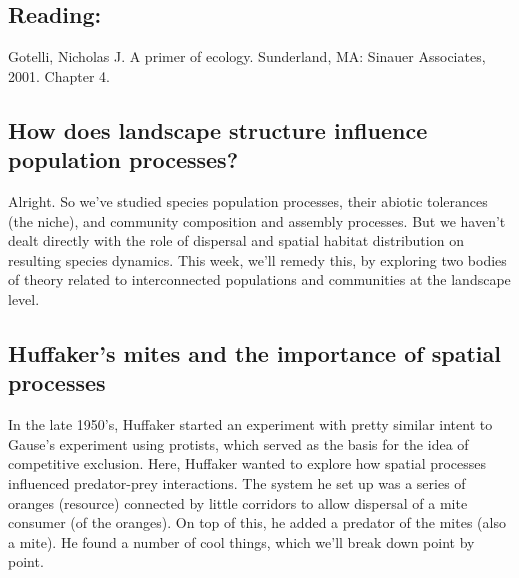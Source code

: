 \documentclass[12pt]{article}
\begin{document}
\subsection*{Reading:}


Gotelli, Nicholas J. A primer of ecology. Sunderland, MA: Sinauer Associates, 2001. Chapter 4. \\














\begin{center}
\noindent\hrulefill 
\end{center}





\clearpage

\subsection*{How does landscape structure influence population processes?}

Alright. So we've studied species population processes, their abiotic tolerances (the niche), and community composition and assembly processes. But we haven't dealt directly with the role of dispersal and spatial habitat distribution on resulting species dynamics. This week, we'll remedy this, by exploring two bodies of theory related to interconnected populations and communities at the landscape level. 





\bigskip


\subsection*{Huffaker's mites and the importance of spatial processes}

In the late 1950's, Huffaker started an experiment with pretty similar intent to Gause's experiment using protists, which served as the basis for the idea of competitive exclusion. Here, Huffaker wanted to explore how spatial processes influenced predator-prey interactions. The system he set up was a series of oranges (resource) connected by little corridors to allow dispersal of a mite consumer (of the oranges). On top of this, he added a predator of the mites (also a mite). He found a number of cool things, which we'll break down point by point.
\end{document}
